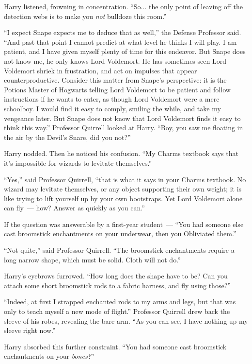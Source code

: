 Harry listened, frowning in concentration. ``So... the only point of leaving off the detection webs is to make you \emph{not} bulldoze this room.''

``I expect Snape expects me to deduce that as well,'' the Defense Professor said. ``And past that point I cannot predict at what level he thinks I will play. I am patient, and I have given myself plenty of time for this endeavor. But Snape does not know me, he only knows Lord Voldemort. He has sometimes seen Lord Voldemort shriek in frustration, and act on impulses that appear counterproductive. Consider this matter from Snape's perspective: it is the Potions Master of Hogwarts telling Lord Voldemort to be patient and follow instructions if he wants to enter, as though Lord Voldemort were a mere schoolboy. I would find it easy to comply, smiling the while, and take my vengeance later. But Snape does not know that Lord Voldemort finds it easy to think this way.'' Professor Quirrell looked at Harry. ``Boy, you saw me floating in the air by the Devil's Snare, did you not?''

Harry nodded. Then he noticed his confusion. ``My Charms textbook says that it's impossible for wizards to levitate themselves.''

``Yes,'' said Professor Quirrell, ``that is what it says in your Charms textbook. No wizard may levitate themselves, or any object supporting their own weight; it is like trying to lift yourself up by your own bootstraps. Yet Lord Voldemort alone can fly~--- how? Answer as quickly as you can.''

If the question was answerable by a first-year student~--- ``You had someone else cast broomstick enchantments on your underwear, then you Obliviated them.''

``Not quite,'' said Professor Quirrell. ``The broomstick enchantments require a long narrow shape, which must be solid. Cloth will not do.''

Harry's eyebrows furrowed. ``How long does the shape have to be? Can you attach some short broomstick rods to a fabric harness, and fly using those?''

``Indeed, at first I strapped enchanted rods to my arms and legs, but that was only to teach myself a new mode of flight.'' Professor Quirrell drew back the sleeve of his robes, revealing the bare arm. ``As you can see, I have nothing up my sleeve right now.''

Harry absorbed this further constraint. ``You had someone cast broomstick enchantments on your \emph{bones?}''

